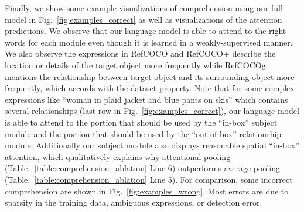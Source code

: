 Finally, we show some example visualizations of comprehension using our full model in Fig.~\ref{fig:examples_correct} as well as visualizations of the attention predictions. We observe that our language model is able to attend to the right words for each module even though it is learned in a weakly-supervised manner.
We also observe the expressions in RefCOCO and RefCOCO+ describe the location or details of the target object more frequently while RefCOCOg mentions the relationship between target object and its surrounding object more frequently, which accords with the dataset property.
Note that for some complex expressions like ``woman in plaid jacket and blue pants on skis'' which contains several relationships (last row in Fig.~\ref{fig:examples_correct}), our language model is able to attend to the portion that should be used by the ``in-box'' subject module and the portion that should be used by the ``out-of-box'' relationship module.
Additionally our subject module also displays reasonable spatial ``in-box'' attention, which qualitatively explains why attentional pooling (Table.~\ref{table:comprehension_ablation} Line 6) outperforms average pooling (Table.~\ref{table:comprehension_ablation} Line 5).
For comparison, some incorrect comprehension are shown in Fig.~\ref{fig:examples_wrong}.
Most errors are due to sparsity in the training data, ambiguous expressions, or detection error.

\vspace{-.2cm}
